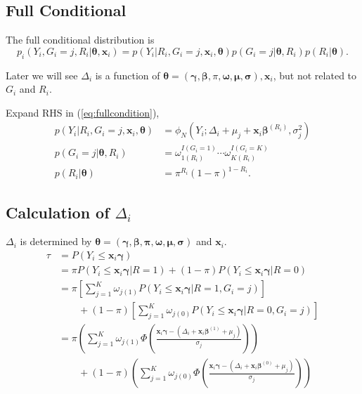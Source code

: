 \subsection{Full Conditional}
The full conditional distribution is
\begin{equation}\label{eq:fullcondition}
p_i(Y_i, G_i = j, R_i | \bm \theta, \bm x_i) = p(Y_i|R_i, G_i = j, \bm x_i, \bm \theta) p(G_i = j | \bm \theta, R_i) p(R_i|\bm \theta).
\end{equation}

Later we will see $\Delta_i$ is a function of $\bm \theta = (\bm \gamma, \bm \beta, \pi, \bm \omega, \bm \mu, \bm \sigma), \bm x_i$, but not related to $G_i$ and $R_i$.

Expand RHS in (\ref{eq:fullcondition}),
\begin{align*}
p(Y_i|R_i, G_i = j, \bm x_i, \bm \theta) & = \phi_N(Y_i; \Delta_i + \mu_j + \bm x_i \bm \beta^{(R_i)}, \sigma_j^2) \\
p(G_i = j | \bm \theta, R_i)             & = \omega_{1(R_i)}^{I(G_i= 1)} \cdots \omega_{K(R_i)}^{I(G_i=K)}         \\
p(R_i|\bm \theta)                        & = \pi^{R_i} (1 - \pi)^{1 - R_i}.
\end{align*}

\subsection{Calculation of $\Delta_i$}

$\Delta_i$ is determined by $\bm \theta = (\bm{\gamma, \beta, \pi, \omega, \mu, \sigma})$ and $\bm x_i$.
\begin{align*}
\tau & = P(Y_i \leq \bm x_i \bm \gamma)                                                                                                                        \\
     & = \pi P(Y_i \le \bm x_i \bm \gamma | R= 1) +  (1- \pi) P(Y_i \le \bm x_i \bm \gamma | R= 0)                                                             \\
     & = \pi \left[ \sum_{j=1}^K \omega_{j(1)} P(Y_i \le \bm x_i\bm \gamma |R = 1, G_i = j) \right]                                                            \\
     & \qquad  + (1-\pi) \left[ \sum_{j=1}^K \omega_{j(0)} P(Y_i \le \bm x_i\bm \gamma |R = 0, G_i=j) \right]                                                  \\
     & = \pi \left( \sum_{j = 1}^K \omega_{j(1)} \Phi \left( \frac{\bm x_i\bm \gamma - (\Delta_i + \bm x_i \bm \beta^{(1)} + \mu_j)}{\sigma_j} \right) \right) \\
     & \qquad + (1 - \pi) \left( \sum_{j = 1}^K \omega_{j(0)} \Phi \left( \frac{\bm x_i\bm \gamma - (\Delta_i + \bm x_i\bm \beta^{(0)} + \mu_j)}{\sigma_j} \right) \right)
\end{align*}

